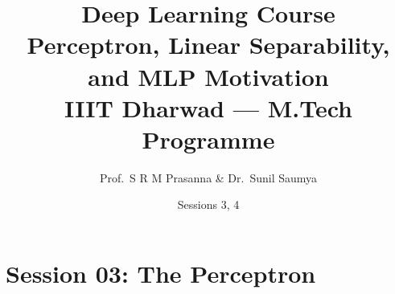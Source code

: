 \documentclass[12pt,a4paper]{article}
\title{%
  {\Large\bfseries Deep Learning Course}\\[6pt]
  {\LARGE Perceptron, Linear Separability, and MLP Motivation}\\[4pt]
  {\normalsize IIIT Dharwad --- M.Tech Programme}
}
\author{Prof.\ S R M Prasanna \& Dr.\ Sunil Saumya}
\date{Sessions 3, 4}
\begin{document}
\maketitle
\tableofcontents
\clearpage

\part{Session 03: The Perceptron}


\end{document}
